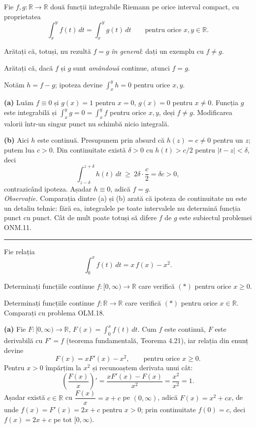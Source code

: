 Fie $f,g:\mathbb{R}\to\mathbb{R}$ două funcții integrabile Riemann pe orice
interval compact, cu proprietatea
\[ \int_x^{y}f(t)\,dt=\int_x^{y}g(t)\,dt\qquad\text{pentru orice }x,y\in\mathbb{R}. \]
\begin{parti}
  \item Arătați că, totuși, nu rezultă $f=g$ \emph{în general}: dați un exemplu cu $f\neq g$.
  \item Arătați că, dacă $f$ și $g$ sunt \emph{amândouă} continue, atunci $f=g$.
\end{parti}
\sol Notăm $h=f-g$; ipoteza devine $\int_x^{y}h=0$ pentru orice $x,y$.

\noindent\textbf{(a)} Luăm $f\equiv0$ și $g(x)=1$ pentru $x=0$, $g(x)=0$ pentru
$x\neq0$. Funcția $g$ este integrabilă și $\int_x^{y}g=0=\int_x^{y}f$ pentru orice
$x,y$, deși $f\neq g$. Modificarea valorii într-un singur punct nu schimbă nicio
integrală.

\noindent\textbf{(b)} Aici $h$ este continuă. Presupunem prin absurd că
$h(z)=c\neq0$ pentru un $z$; putem lua $c>0$. Din continuitate există $\delta>0$
cu $h(t)>c/2$ pentru $|t-z|<\delta$, deci
\[ \int_{z-\delta}^{z+\delta}h(t)\,dt\ \ge\ 2\delta\cdot\frac{c}{2}=\delta c>0, \]
contrazicând ipoteza. Așadar $h\equiv0$, adică $f=g$.\\[2pt]
\emph{Observație.} Comparația dintre (a) și (b) arată că ipoteza de continuitate
nu este un detaliu tehnic: fără ea, integralele pe toate intervalele nu determină
funcția punct cu punct. Cât de mult poate totuși să difere $f$ de $g$ este
subiectul problemei ONM.11.
\vspace{1mm}\hrule

Fie relația
\[ \int_0^x f(t)\,dt = x\,f(x) - x^2. \tag{$\ast$} \]
\begin{parti}
  \item Determinați funcțiile continue $f:[0,\infty)\to\mathbb{R}$ care verifică
        $(\ast)$ pentru orice $x\ge0$.
  \item Determinați funcțiile continue $f:\mathbb{R}\to\mathbb{R}$ care verifică
        $(\ast)$ pentru orice $x\in\mathbb{R}$. Comparați cu problema OLM.18.
\end{parti}
\sol\noindent\textbf{(a)} Fie $F:[0,\infty)\to\mathbb{R}$, $F(x)=\int_0^x f(t)\,dt$. Cum $f$ este
continuă, $F$ este derivabilă cu $F'=f$ (teorema fundamentală, Teorema 4.21), iar
relația din enunț devine
\[ F(x) = x F'(x) - x^2, \qquad \text{pentru orice } x\ge 0. \]
Pentru $x>0$ împărțim la $x^2$ și recunoaștem derivata unui cât:
\[ \left(\frac{F(x)}{x}\right)' = \frac{xF'(x)-F(x)}{x^2} = \frac{x^2}{x^2} = 1 . \]
Așadar există $c\in\mathbb{R}$ cu $\dfrac{F(x)}{x} = x + c$ pe $(0,\infty)$, adică
$F(x)=x^2+cx$, de unde $f(x)=F'(x)=2x+c$ pentru $x>0$; prin continuitate
$f(0)=c$, deci $f(x)=2x+c$ pe tot $[0,\infty)$.

